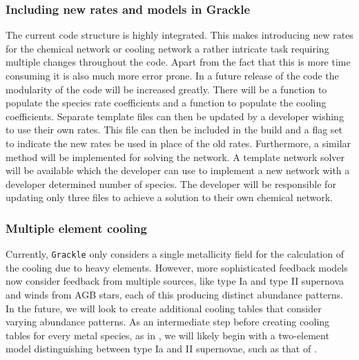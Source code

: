 \subsubsection{Including new rates and models in Grackle}
The current code structure is highly integrated. This makes introducing new rates for the 
chemical network or cooling network a rather intricate task requiring multiple changes throughout the code. 
Apart from the fact that this is more time consuming it is also much more error prone. In a future release of the 
code the modularity of the code will be increased greatly. There will be a function to populate the species 
rate coefficients and a function to populate the cooling coefficients. Separate template files can then be 
updated by a developer wishing to use their own rates. This file can then be included in the build and a flag
set to indicate the new rates be used in place of the old rates. Furthermore, a similar method will be 
implemented for solving the network. A template network solver will be available which the developer can use to 
implement a new network with a developer determined number of species. The developer will be responsible for
updating only three files to achieve a solution to their own chemical network. 


\subsubsection{Multiple element cooling}

Currently, \texttt{Grackle} only considers a single metallicity field
for the calculation of the cooling due to heavy elements.  However,
more sophisticated feedback models now consider feedback from multiple
sources, like type Ia and type II supernova and winds from AGB stars,
each of this producing distinct abundance patterns.  In the future, we
will look to create additional cooling tables that consider varying
abundance patterns.  As an intermediate step before creating cooling
tables for every metal species, as in \citet{2009MNRAS.393...99W}, we
will likely begin with a two-element model distinguishing between type
Ia and II supernovae, such as that of \citet{2013MNRAS.433.3005D}.



